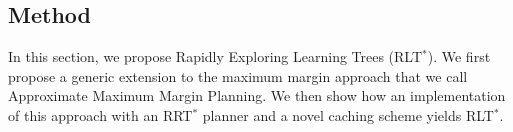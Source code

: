 \documentclass[a4paper,11pt]{report}
\begin{document}
\subsection{Method}
	In this section, we propose Rapidly Exploring Learning Trees (RLT$^*$).  We first propose a generic extension to the maximum margin approach that we call Approximate Maximum Margin Planning.  We then show how an implementation of this approach with an RRT$^*$ planner and a novel caching scheme yields RLT$^*$.


\end{document}
